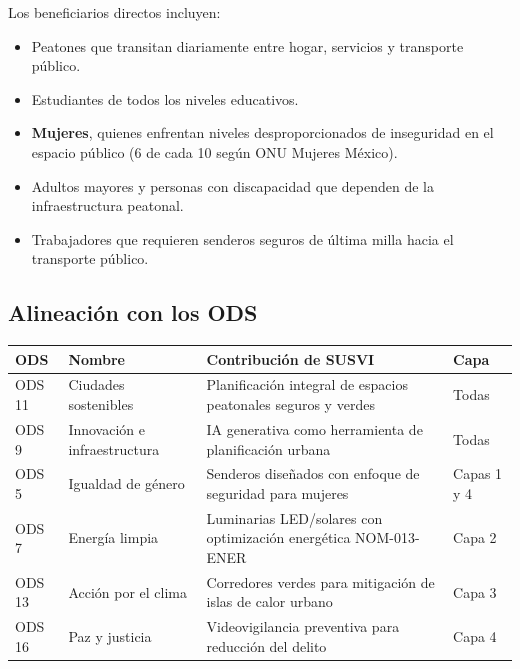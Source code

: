 \documentclass[12pt,a4paper]{article}
\begin{document}
\medskip
Los beneficiarios directos incluyen:

\begin{itemize}[leftmargin=1.5cm, itemsep=3pt]
  \item Peatones que transitan diariamente entre hogar, servicios y transporte público.
  \item Estudiantes de todos los niveles educativos.
  \item \textbf{Mujeres}, quienes enfrentan niveles desproporcionados de inseguridad en el espacio público (6 de cada 10 según ONU Mujeres México).
  \item Adultos mayores y personas con discapacidad que dependen de la infraestructura peatonal.
  \item Trabajadores que requieren senderos seguros de última milla hacia el transporte público.
\end{itemize}

\subsection{Alineación con los ODS}

\begin{table}[H]
\centering
\small
\renewcommand{\arraystretch}{1.3}
\begin{tabularx}{\textwidth}{l l X l}
\toprule
\rowcolor{azuloscuro}
\color{white}\textbf{ODS} & \color{white}\textbf{Nombre} & \color{white}\textbf{Contribución de SUSVI} & \color{white}\textbf{Capa} \\
\midrule
ODS 11 & Ciudades sostenibles & Planificación integral de espacios peatonales seguros y verdes & Todas \\
\rowcolor{fondoazul}
ODS 9 & Innovación e infraestructura & IA generativa como herramienta de planificación urbana & Todas \\
ODS 5 & Igualdad de género & Senderos diseñados con enfoque de seguridad para mujeres & Capas 1 y 4 \\
\rowcolor{fondoazul}
ODS 7 & Energía limpia & Luminarias LED/solares con optimización energética NOM-013-ENER & Capa 2 \\
ODS 13 & Acción por el clima & Corredores verdes para mitigación de islas de calor urbano & Capa 3 \\
\rowcolor{fondoazul}
ODS 16 & Paz y justicia & Videovigilancia preventiva para reducción del delito & Capa 4 \\
\bottomrule
\end{tabularx}
\end{table}
\end{document}
